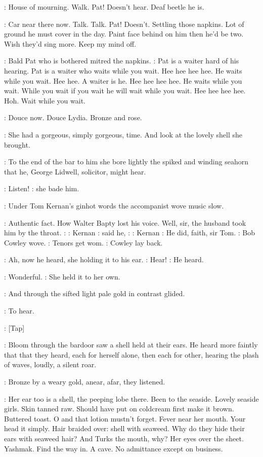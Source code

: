 \BloomInt:
House of mourning. Walk. Pat! Doesn't hear. Deaf beetle he is.

\BloomInt:
Car near there now. Talk. Talk. Pat! Doesn't. Settling those napkins.
Lot of ground he must cover in the day. Paint face behind on him then he'd
be two. Wish they'd sing more. Keep my mind off.

:
Bald Pat who is bothered mitred the napkins.
\BloomInt:
Pat is a waiter hard of
his hearing. Pat is a waiter who waits while you wait. Hee hee hee hee. He
waits while you wait. Hee hee. A waiter is he. Hee hee hee hee. He waits
while you wait. While you wait if you wait he will wait while you wait.
Hee hee hee hee. Hoh. Wait while you wait.

:
Douce now.
Douce Lydia. Bronze and rose.

:
She had a gorgeous, simply gorgeous, time. And look at the lovely
shell she brought.

:
To the end of the bar to him she bore lightly the spiked and winding
seahorn that he, George Lidwell, solicitor, might hear.

\MissD:
Listen!
:
she bade him.

:
Under Tom Kernan's ginhot words the accompanist wove music slow.

\BloomInt:
Authentic fact. How Walter Bapty lost his voice. Well, sir, the husband
took him by the throat.
\Song:
\Stage:
Kernan
\BloomInt:
said he,
\Song:
\Stage:
Kernan
\BloomInt:
He did, faith, sir Tom.
:
Bob Cowley wove.
\BloomInt:
Tenors get wom.
:
Cowley lay back.

:
Ah, now he heard, she holding it to his ear.
\MissD:
Hear!
:
He heard.

\Lidwell:
Wonderful.
:
She held it to her own.

:
And through the sifted light pale gold
in contrast glided.

\BloomInt:
To hear.

\Stripling:
[Tap]

:
Bloom through the bardoor saw a shell held at their ears. He heard
more faintly that that they heard, each for herself alone, then each for
other, hearing the plash of waves, loudly, a silent roar.

:
Bronze by a weary gold, anear, afar, they listened.

\BloomInt:
Her ear too is a shell, the peeping lobe there. Been to the seaside.
Lovely seaside girls. Skin tanned raw. Should have put on coldcream first
make it brown.
Buttered toast. O and that lotion mustn't forget. Fever
near her mouth. Your head it simply. Hair braided over: shell with
seaweed. Why do they hide their ears with seaweed hair? And Turks the
mouth, why? Her eyes over the sheet. Yashmak. Find the way in. A cave. No
admittance except on business.

